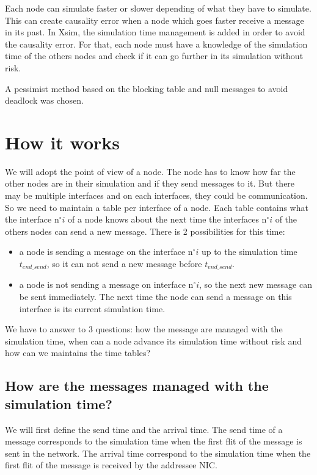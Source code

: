 Each node can simulate faster or slower depending of what they have to
simulate. This can create causality error when a node which goes faster
receive a message in its past. In Xsim, the simulation time management
is added in order to avoid the causality error. For that, each node
must have a knowledge of the simulation time of the others nodes and
check if it can go further in its simulation without risk.

A pessimist method based on the blocking table and null messages to 
avoid deadlock was chosen.



\section{How it works}

We will adopt the point of view of a node. The node has to know how far the
other nodes are in their simulation and if they send messages to it.
But there may be multiple interfaces and on each interfaces, they could be
communication. So we need to maintain a table per interface of a node.
Each table contains what the interface n$^{\circ}i$ of a node knows
about the next time the interfaces n$^{\circ}i$ of the others nodes 
can send a new message. There is 2 possibilities for this time:
\begin{itemize}
    \item a node is sending a message on the interface n$^{\circ}i$ up to
    the simulation time $t_{end\_send}$, so it can not send a new message before
    $t_{end\_send}$.
    \item a node is not sending a message on interface n$^{\circ}i$, so 
    the next new message can be sent immediately. The next time the node can 
    send a message on this interface is its current simulation time.
\end{itemize}


We have to answer to 3 questions: 
how the message are managed with the simulation time,
when can a node advance its simulation time without risk and
how can we maintains the time tables?


\subsection{How are the messages managed with the simulation time?}

We will first define the send time and the arrival time.
The send time of a message corresponds to the simulation time when the 
first flit of the message is sent in the network. 
The arrival time correspond to the simulation time when the first flit
of the message is received by the addressee NIC.\\

